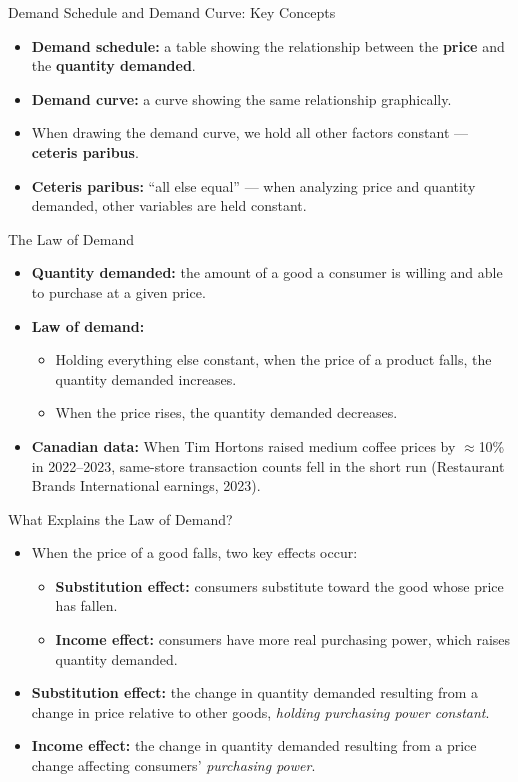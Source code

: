 \documentclass[aspectratio=169]{beamer}
\begin{document}
\begin{frame}{Demand Schedule and Demand Curve: Key Concepts}
\transfade
\begin{itemize}[<+->]
  \item \textbf{Demand schedule:} a table showing the relationship between the \textbf{price} and the \textbf{quantity demanded}.
  \item \textbf{Demand curve:} a curve showing the same relationship graphically.
  \item When drawing the demand curve, we hold all other factors constant --- \textbf{ceteris paribus}.
  \item \textbf{Ceteris paribus:} ``all else equal'' --- when analyzing price and quantity demanded, other variables are held constant.
\end{itemize}
\end{frame}

\begin{frame}{The Law of Demand}
\transfade
\begin{itemize}[<+->]
  \item \textbf{Quantity demanded:} the amount of a good a consumer is willing and able to purchase at a given price.
  \item \textbf{Law of demand:}
  \begin{itemize}[<+->]
    \item Holding everything else constant, when the price of a product \alert{falls}, the quantity demanded \alert{increases}.
    \item When the price \alert{rises}, the quantity demanded \alert{decreases}.
  \end{itemize}
  \item \textbf{Canadian data:} When Tim Hortons raised medium coffee prices by $\approx$10\% in 2022--2023, same-store transaction counts fell in the short run (Restaurant Brands International earnings, 2023).
\end{itemize}
\end{frame}

\begin{frame}{What Explains the Law of Demand?}
\transfade
\begin{itemize}[<+->]
  \item When the price of a good falls, two key effects occur:
  \begin{itemize}[<+->]
    \item \textbf{Substitution effect:} consumers substitute toward the good whose price has fallen.
    \item \textbf{Income effect:} consumers have more real purchasing power, which raises quantity demanded.
  \end{itemize}
  \item \textbf{Substitution effect:} the change in quantity demanded resulting from a change in price relative to other goods, \emph{holding purchasing power constant}.
  \item \textbf{Income effect:} the change in quantity demanded resulting from a price change affecting consumers' \emph{purchasing power}.
\end{itemize}
\end{frame}
\end{document}
